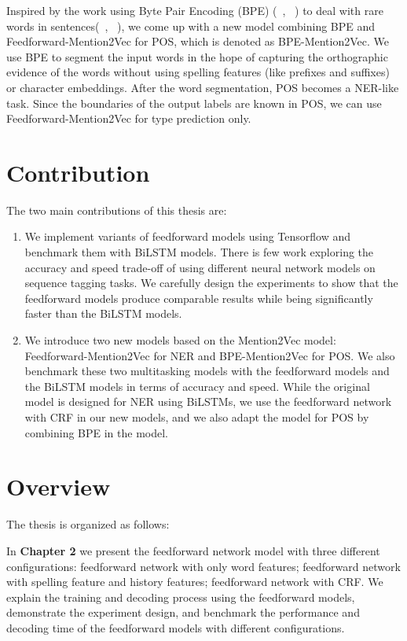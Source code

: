 \documentclass{sfuthesis}
\begin{document}
Inspired by the work using Byte Pair Encoding (BPE) (~\citeauthor{gage1994new}, ~\citeyear{gage1994new}) to deal with rare words in sentences(~\citeauthor{sennrich2015neural}, ~\citeyear{sennrich2015neural}), we come up with a new model combining BPE and Feedforward-Mention2Vec for POS, which is denoted as BPE-Mention2Vec. We use BPE to segment the input words in the hope of capturing the orthographic evidence of the words without using spelling features (like prefixes and suffixes) or character embeddings. After the word segmentation, POS becomes a NER-like task. Since the boundaries of the output labels are known in POS, we can use Feedforward-Mention2Vec for type prediction only.

\section{Contribution}
The two main contributions of this thesis are:

\begin{enumerate}
  \item We implement variants of feedforward models using Tensorflow and benchmark them with BiLSTM models. There is few work exploring the accuracy and speed trade-off of using different neural network models on sequence tagging tasks. We carefully design the experiments to show that the feedforward models produce comparable results while being significantly faster than the BiLSTM models.
  \item We introduce two new models based on the Mention2Vec model: Feedforward-Mention2Vec for NER and BPE-Mention2Vec for POS. We also benchmark these two multitasking models with the feedforward models and the BiLSTM models in terms of accuracy and speed. While the original model is designed for NER using BiLSTMs, we use the feedforward network with CRF in our new models, and we also adapt the model for POS by combining BPE in the model.
\end{enumerate}


\section{Overview}
The thesis is organized as follows:

In \textbf{Chapter 2}  we present the feedforward network model with three different configurations: feedforward network with only word features; feedforward network with spelling feature and history features; feedforward network with CRF. We explain the training and decoding process using the feedforward models, demonstrate the experiment design, and benchmark the performance and decoding time of the feedforward models with different configurations.
\end{document}
